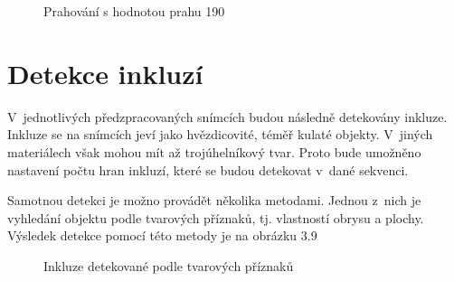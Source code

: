 \documentclass[12pt, a4paper]{report}
\begin{document}
	\begin{figure}[!htb]
	\centering
	\label{fig:prahovani_190}
	\caption{Prahování s hodnotou prahu 190}
	\end{figure}
	
	\section{Detekce inkluzí}
V~jednotlivých předzpracovaných snímcích budou následně detekovány inkluze. Inkluze se na snímcích jeví jako hvězdicovité, téměř kulaté objekty. V~jiných materiálech však mohou mít až trojúhelníkový tvar. Proto bude umožněno nastavení počtu hran inkluzí, které se budou detekovat v~dané sekvenci.

Samotnou detekci je možno provádět několika metodami. Jednou z~nich je vyhledání objektu podle tvarových příznaků, tj. vlastností obrysu a plochy. Výsledek detekce pomocí této metody je na obrázku 3.9

\begin{figure}[!htb]
	\centering
	\label{fig:tvarove_priznaky}
	\caption{Inkluze detekované podle tvarových příznaků}
	\end{figure}
\end{document}
